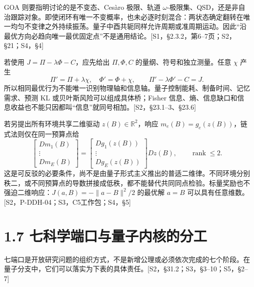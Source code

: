 \documentclass[
  11pt,
  oneside]{book}
\begin{document}
GOA 则要指明讨论的是不变态、Cesàro 极限、轨道
\(\omega\)-极限集、QSD，还是非自治跟踪对象。即使闭环有唯一不变概率，也未必逐时刻混合：两状态确定翻转在唯一均匀不变律之外持续振荡。量子中酉共轭同样允许周期或准周期运动。因此``沿最优方向必趋向唯一最优固定点''不是通用结论。{[}S1，§2.3.2，第6--7页；S2，§21；S4，§4{]}

若使用 \(J=\Pi-\lambda\Phi-C\)，应先给出 \(\Pi,\Phi,C\)
的量纲、符号和独立测量。任意 \(\chi\) 产生 \[
\Pi'=\Pi+\lambda\chi,\quad \Phi'=\Phi+\chi,
\qquad \Pi'-\lambda\Phi'-C=J.
\]
所以相同最优行为不能唯一识别物理轴和信息轴。量子控制能耗、制备时间、记忆需求、预测
KL 或贝叶斯风险可以组成具体桥；Fisher
信息、熵、信息缺口和信息收益也不能只因都叫``信息''就同号相加。{[}S2，§23.1--3、§23.6{]}

若另提出所有环境共享二维驱动 \(z(B)\in\mathbb R^2\)，响应
\(m_e(B)=g_e(z(B))\)，链式法则仅在同一预算点给 \[
\begin{bmatrix}Dm_1(B)\\\vdots\\Dm_E(B)\end{bmatrix}
=\begin{bmatrix}Dg_1(z(B))\\\vdots\\Dg_E(z(B))\end{bmatrix}Dz(B),
\qquad\operatorname{rank}\le2.
\]
这是可反驳的必要条件，尚不是由量子形式主义推出的普适二维律。不同环境分别秩二，或不同预算点的导数拼接成低秩，都不能替代共同同点检验。标量奖励也不强迫二维响应：\(J(a,B)=-\|a-B\|^2/2\)
的最优解 \(a=B\)
可以具有任意维数。{[}S2，P-DDH-04；S3，C5工作包；S4，§5{]}

\hypertarget{ux4e03ux79d1ux5b66ux7aefux53e3ux4e0eux91cfux5b50ux5185ux6838ux7684ux5206ux5de5}{%
\section{1.7
七科学端口与量子内核的分工}\label{ux4e03ux79d1ux5b66ux7aefux53e3ux4e0eux91cfux5b50ux5185ux6838ux7684ux5206ux5de5}}

七端口是开放研究问题的组织方式，不是新增公理或必须依次完成的七个阶段。在量子分支中，它们可以落实为下表的具体责任。{[}S2，§31.2；S3，§3--10；S5，§2--7{]}
\end{document}

